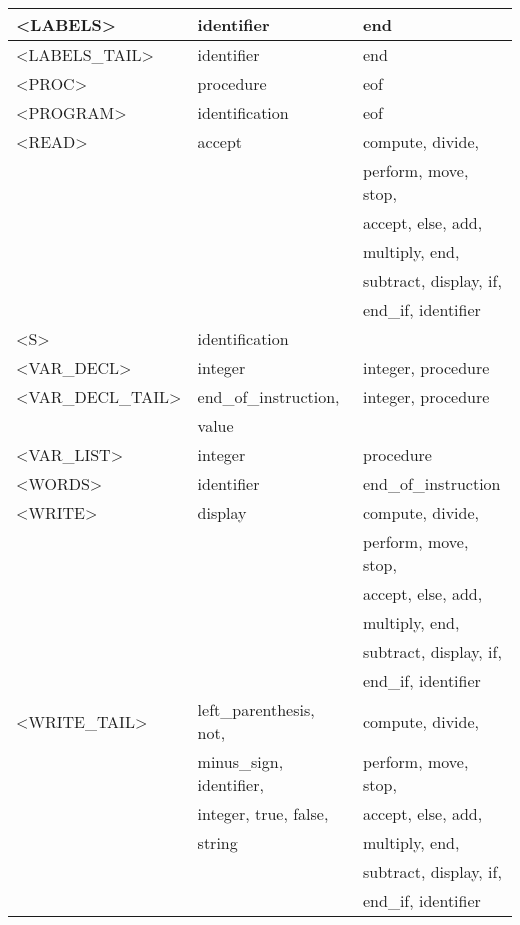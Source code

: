\begin{longtable}{|l|l|l|}
  \hline
<LABELS>  &  identifier &   end \\ 
  \hline
<LABELS\_TAIL>  &  identifier &   end \\ 
  \hline
<PROC>  &  procedure &   eof \\ 
  \hline
<PROGRAM>  &  identification &   eof \\ 
  \hline
<READ>  &  accept &   compute, divide, \\ 
  &  &   perform, move, stop, \\ 
  &  &   accept, else, add, \\ 
  &  &   multiply, end, \\ 
  &  &   subtract, display, if, \\ 
  &  &   end\_if, identifier \\ 
  \hline
<S>  &  identification &   \\ 
  \hline
<VAR\_DECL>  &  integer &   integer, procedure \\ 
  \hline
<VAR\_DECL\_TAIL>  &  end\_of\_instruction, &   integer, procedure \\ 
  &  value &   \\ 
  \hline
<VAR\_LIST>  &  integer &   procedure \\ 
  \hline
<WORDS>  &  identifier &   end\_of\_instruction \\ 
  \hline
<WRITE>  &  display &   compute, divide, \\ 
  &  &   perform, move, stop, \\ 
  &  &   accept, else, add, \\ 
  &  &   multiply, end, \\ 
  &  &   subtract, display, if, \\ 
  &  &   end\_if, identifier \\ 
  \hline
<WRITE\_TAIL>  &  left\_parenthesis, not, &   compute, divide, \\ 
  &  minus\_sign, identifier, &   perform, move, stop, \\ 
  &  integer, true, false, &   accept, else, add, \\ 
  &  string &   multiply, end, \\ 
  &  &   subtract, display, if, \\ 
  &  &   end\_if, identifier \\ 
  \hline
  
  \end{longtable}



